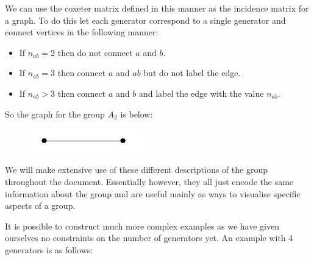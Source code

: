 \documentclass[a4paper,12pt]{article}
\begin{document}
\begin{example}
We can use the coxeter matrix defined in this manner as the incidence matrix for a graph. To do this let each generator correspond to a single generator and connect vertices in the following manner:

\begin{itemize}
	\item If $n_{ab} = 2$ then do not connect $a$ and $b$.
	\item If $n_{ab} = 3$ then connect $a$ and $ab$ but do not label the edge.
	\item If $n_{ab} > 3$ then connect $a$ and $b$ and label the edge with the value $n_{ab}$.
\end{itemize}

So the graph for the group $A_2$ is below:

\begin{figure}[H]
	\centering
		\includegraphics[width=50mm]{A_2.png}
	\label{fig:A_2}
\end{figure}

We will make extensive use of these different descriptions of the group throughout the document. Essentially however, they all just encode the same information about the group and are useful mainly as ways to visualise specific aspects of a group.
\end{example}

It is possible to construct much more complex examples as we have given ourselves no constraints on the number of generators yet. An example with 4 generators is as follows:
\end{document}
